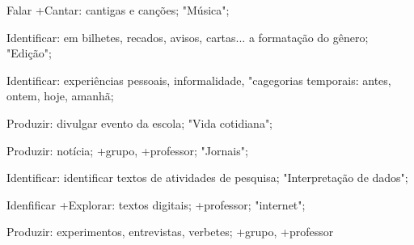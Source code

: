  Falar +Cantar: cantigas e canções; "Música";

 Identificar: em bilhetes, recados, avisos, cartas... a formatação do gênero; "Edição"; 

 Identificar: experiências pessoais, informalidade, "cagegorias temporais: antes, ontem, hoje, amanhã;

 Produzir: divulgar evento da escola; "Vida cotidiana";

 Produzir: notícia; +grupo, +professor; "Jornais";

 Identificar: identificar textos de atividades de pesquisa; "Interpretação de dados";

 Idenfificar +Explorar: textos digitais; +professor; "internet"; 

 Produzir: experimentos, entrevistas, verbetes; +grupo, +professor

